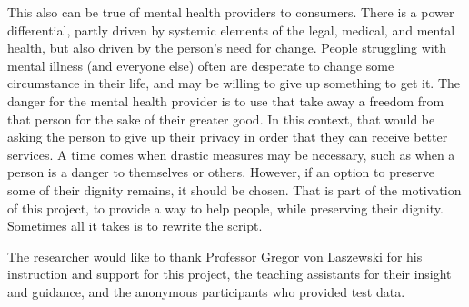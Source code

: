 \documentclass[sigconf]{acmart}
\begin{document}
This also can be true of mental health providers to consumers. There is a power differential, partly driven by systemic elements of the legal, medical, and mental health, but also driven by the person's need for change. People struggling with mental illness (and everyone else) often are desperate to change some circumstance in their life, and may be willing to give up something to get it. The danger for the mental health provider is to use that take away a freedom from that person for the sake of their greater good. In this context, that would be asking the person to give up their privacy in order that they can receive better services. A time comes when drastic measures may be necessary, such as when a person is a danger to themselves or others. However, if an option to preserve some of their dignity remains, it should be chosen. That is part of the motivation of this project, to provide a way to help people, while preserving their dignity. Sometimes all it takes is to rewrite the script. 

\begin{acks}
The researcher would like to thank Professor Gregor von Laszewski for his instruction and support for this project, the teaching assistants for their insight and guidance, and the anonymous participants who provided test data.
\end{acks}


 
\end{document}
